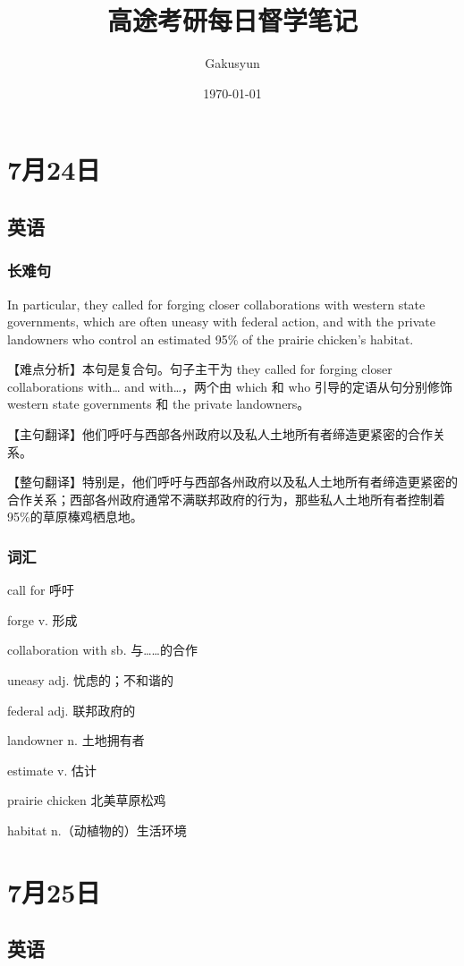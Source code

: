 \documentclass[UTF8]{ctexart}
\title{高途考研每日督学笔记}
\author{Gakusyun}
\date{\today}
\begin{document}
\maketitle
\newpage
\tableofcontents
\newpage
\section{7月24日}
\subsection{英语}
\subsubsection{长难句}
In particular, they called for forging closer collaborations with western state
governments, which are often uneasy with federal action, and with the private
landowners who control an estimated 95\% of the prairie chicken's habitat.

【难点分析】本句是复合句。句子主干为 they called for forging closer
collaborations with… and with…，两个由 which 和 who 引导的定语从句分别修饰western state governments 和 the private landowners。

【主句翻译】他们呼吁与西部各州政府以及私人土地所有者缔造更紧密的合作关系。

【整句翻译】特别是，他们呼吁与西部各州政府以及私人土地所有者缔造更紧密的合作关系；西部各州政府通常不满联邦政府的行为，那些私人土地所有者控制着 95\%的草原榛鸡栖息地。
\subsubsection{词汇}
\begin{multicols}{2}
    call for 呼吁

    forge v. 形成

    collaboration with sb. 与……的合作

    uneasy adj. 忧虑的；不和谐的

    federal adj. 联邦政府的

    landowner n. 土地拥有者

    estimate v. 估计

    prairie chicken 北美草原松鸡

    habitat n.（动植物的）生活环境
\end{multicols}
\section{7月25日}
\subsection{英语}
\end{document}

